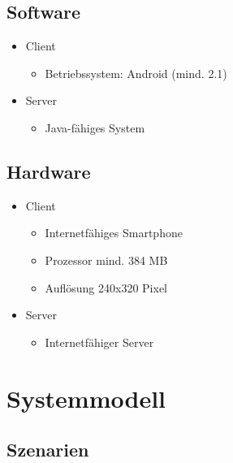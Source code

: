 \documentclass[a4paper,10pt]{scrartcl}
\begin{document}
\subsection{Software}
\begin{itemize}
\item Client
   \begin{itemize}
      \item Betriebssystem: Android (mind. 2.1)
   \end{itemize}
\item Server
   \begin{itemize}
      \item Java-fähiges System
   \end{itemize}
\end{itemize}

\subsection{Hardware}
\begin{itemize}
\item Client
   \begin{itemize}
      \item Internetfähiges Smartphone
      \item Prozessor mind. 384 MB
      \item Auflösung 240x320 Pixel
   \end{itemize}
\item Server
   \begin{itemize}
      \item Internetfähiger Server
   \end{itemize}
\end{itemize}

\section{Systemmodell}





\subsection{Szenarien}
\end{document}
